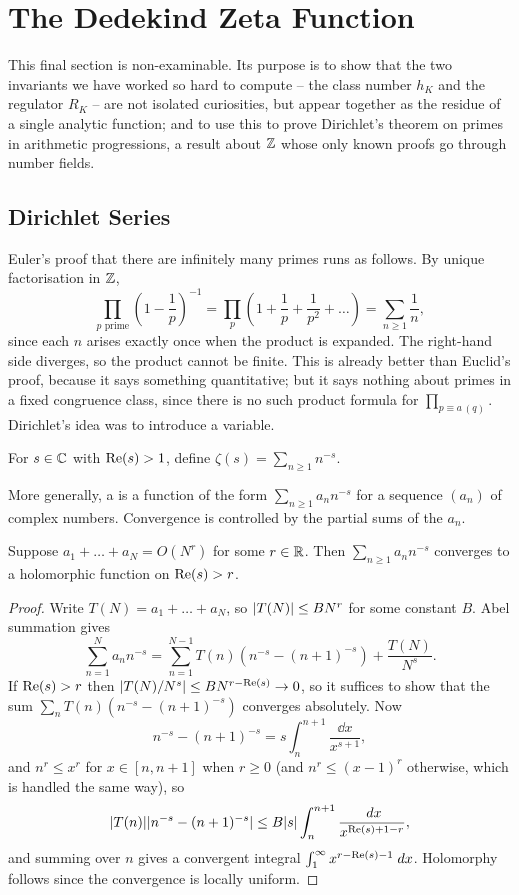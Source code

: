 \documentclass[a4paper]{scrartcl}
\begin{document}
\section{The Dedekind Zeta Function}\label{sec:zeta}

This final section is non-examinable. Its purpose is to show that the two invariants we have worked so hard to compute -- the class number $h_K$ and the regulator $R_K$ -- are not isolated curiosities, but appear together as the residue of a single analytic function; and to use this to prove Dirichlet's theorem on primes in arithmetic progressions, a result about $\mathbb{Z}$ whose only known proofs go through number fields.

\subsection{Dirichlet Series}

Euler's proof that there are infinitely many primes runs as follows. By unique factorisation in $\mathbb{Z}$,
$$\prod_{p \text{ prime}}\left(1-\frac1p\right)^{-1} = \prod_p\left(1+\frac1p+\frac{1}{p^2}+\dots\right) = \sum_{n\ge1}\frac1n,$$
since each $n$ arises exactly once when the product is expanded. The right-hand side diverges, so the product cannot be finite. This is already better than Euclid's proof, because it says something quantitative; but it says nothing about primes in a fixed congruence class, since there is no such product formula for $\prod_{p\equiv a\, (q)}$. Dirichlet's idea was to introduce a variable.

\begin{definition}
	For $s \in \mathbb{C}$ with $\operatorname{Re}(s) > 1$, define $\displaystyle\zeta(s) = \sum_{n\ge1}n^{-s}$.
\end{definition}

More generally, a  is a function of the form $\sum_{n\ge1}a_nn^{-s}$ for a sequence $(a_n)$ of complex numbers. Convergence is controlled by the partial sums of the $a_n$.

\begin{lemma}\label{lem:dirichletconv}
	Suppose $a_1+\dots+a_N = O(N^r)$ for some $r \in \mathbb{R}$. Then $\sum_{n\ge1}a_nn^{-s}$ converges to a holomorphic function on $\operatorname{Re}(s) > r$.
\end{lemma}

\begin{proof}
	Write $T(N) = a_1+\dots+a_N$, so $\lvert T(N)\rvert\le BN^r$ for some constant $B$. Abel summation gives
	$$\sum_{n=1}^Na_nn^{-s} = \sum_{n=1}^{N-1}T(n)\left(n^{-s}-(n+1)^{-s}\right) + \frac{T(N)}{N^s}.$$
	If $\operatorname{Re}(s) > r$ then $\lvert T(N)/N^s\rvert \le B N^{r-\operatorname{Re}(s)}\to0$, so it suffices to show that the sum $\sum_n T(n)\left(n^{-s}-(n+1)^{-s}\right)$ converges absolutely. Now
	$$n^{-s}-(n+1)^{-s} = s\int_n^{n+1}\frac{\dd x}{x^{s+1}},$$
	and $n^r \le x^r$ for $x \in [n,n+1]$ when $r \geq 0$ (and $n^r \le (x-1)^r$ otherwise, which is handled the same way), so
	$$\lvert T(n)\rvert\lvert n^{-s}-(n+1)^{-s}\rvert \le B\lvert s\rvert\int_n^{n+1}\frac{\; d x}{x^{\operatorname{Re}(s)+1-r}},$$
	and summing over $n$ gives a convergent integral $\int_1^\infty x^{r-\operatorname{Re}(s)-1}\; d x$. Holomorphy follows since the convergence is locally uniform.
\end{proof}
\end{document}
